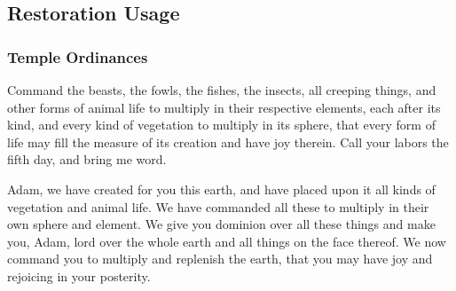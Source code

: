 	

\subsection{Restoration Usage} %
	\label{SPHERE-RESTORATION}

	
		
	\subsubsection{Temple Ordinances}
		\label{SPHERE-TEMPLE}
	
		\begin{compactdesc}
			\item[{\hyperref[TEMPLE-ENDOWMENT-ENDOW-PRE-1990-DAY5]{Fifth day of creation}}] Command the beasts, the fowls, the fishes, the insects, all creeping things, and other forms of animal life to multiply in their respective elements, each after its kind, and every kind of vegetation to multiply in its sphere, that every form of life may fill the measure of its creation and have joy therein. Call your labors the fifth day, and bring me word.
			\item[{\hyperref[TEMPLE-ENDOWMENT-ENDOW-PRE-1990-GARDEN]{Garden}}] Adam, we have created for you this earth, and have placed upon it all kinds of vegetation and animal life. We have commanded all these to multiply in their own sphere and element. We give you dominion over all these things and make you, Adam, lord over the whole earth and all things on the face thereof. We now command you to multiply and replenish the earth, that you may have joy and rejoicing in your posterity.
		\end{compactdesc}
	
